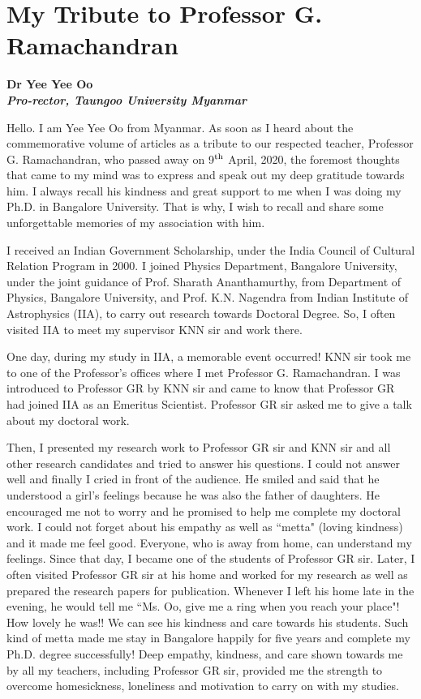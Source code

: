 \chapter{My Tribute to Professor G. Ramachandran}\label{chap8}


\begin{center}
\textbf{Dr Yee Yee Oo}\\
\textbf{\textit{Pro-rector, Taungoo University Myanmar}}
\end{center}

Hello. I am Yee Yee Oo from Myanmar. As soon as I heard about the commemorative volume of articles as a tribute to our respected teacher, Professor G. Ramachandran, who passed away on 9$^{\rm th}$ April, 2020, the foremost thoughts that came to my mind was to express and speak out my deep gratitude towards him. I always recall his kindness and great support to me when I was doing my Ph.D. in Bangalore University. That is why, I wish to recall and share some unforgettable memories of my association with him.  

I received an Indian Government Scholarship, under the India Council of Cultural Relation Program in 2000. I joined Physics Department, Bangalore University, under the joint guidance of Prof. Sharath Ananthamurthy, from Department of Physics, Bangalore University, and Prof. K.N. Nagendra from Indian Institute of Astrophysics (IIA), to carry out research towards Doctoral Degree. So, I often visited IIA to meet my supervisor KNN sir and work there. 

One day, during my study in IIA, a memorable event occurred! KNN sir took me to one of the Professor's offices where I met Professor G. Ramachandran. I was introduced to Professor GR by KNN sir and came to know that Professor GR had joined IIA as an Emeritus Scientist. Professor GR sir asked me to give a talk about my doctoral work. 

Then, I presented my research work to Professor GR sir and KNN sir and all other research candidates and tried to answer his questions. I could not answer well and finally I cried in front of the audience. He smiled and said that he understood a girl's feelings because he was also the father of daughters. He encouraged me not to worry and he promised to help me complete my doctoral work.  I could not forget about his empathy as well as ``metta" (loving kindness) and it made me feel good. Everyone, who is away from home, can understand my feelings. Since that day, I became one of the students of Professor GR sir. Later, I often visited Professor GR sir at his home and worked for my research as well as prepared the research papers for publication. Whenever I left his home late in the evening, he would tell me ``Ms. Oo, give me a ring when you reach your place"! How lovely he was!! We can see his kindness and care towards his students. Such kind of metta made me stay in Bangalore happily for five years and complete my Ph.D. degree successfully! Deep empathy, kindness, and care shown towards me by all my teachers, including Professor GR sir, provided me the strength to overcome homesickness, loneliness and motivation to carry on with my studies. 

